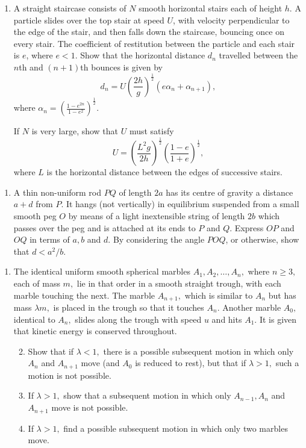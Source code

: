 \documentclass[a4, 11pt]{report}
\newlength{\qspace}
\newcounter{qnumber}
\newenvironment{question}%
 {\vspace{\qspace}
  \begin{enumerate}[\bfseries 1\quad][10]%
    \setcounter{enumi}{\value{qnumber}}%
    \item%
 }
{
  \end{enumerate}
  \filbreak
  \stepcounter{qnumber}
 }
\newenvironment{questionparts}[1][1]%
 {
  \begin{enumerate}[\bfseries (i)]%
    \setcounter{enumii}{#1}
    \addtocounter{enumii}{-1}
    \setlength{\itemsep}{5mm}
    \setlength{\parskip}{8pt}
 }
 {
  \end{enumerate}
 }
\begin{document}
\begin{question}	
A straight staircase consists of $N$ smooth horizontal stairs each
of height $h$. A particle slides over the top stair at speed $U$,
with velocity perpendicular to the edge of the stair, and then falls
down the staircase, bouncing once on every stair. The coefficient
of restitution between the particle and each stair is $e$, where
$e<1$. Show that the horizontal distance $d_{n}$ travelled between
the $n$th and $(n+1)$th bounces is given by 
\[
d_{n}=U\left(\frac{2h}{g}\right)^{\frac{1}{2}}\left(e\alpha_{n}+\alpha_{n+1}\right),
\]
where ${\displaystyle \alpha_{n}=\left(\frac{1-e^{2n}}{1-e^{2}}\right)^{\frac{1}{2}}}$. 


If $N$ is very large, show that $U$ must satisfy
\[
U=\left(\frac{L^{2}g}{2h}\right)^{\frac{1}{2}}\left(\frac{1-e}{1+e}\right)^{\frac{1}{2}},
\]
where $L$ is the horizontal distance between the edges of successive
stairs. 
\end{question}


\begin{question}
A thin non-uniform rod $PQ$ of length $2a$ has its centre of gravity
a distance $a+d$ from $P$. It hangs (not vertically) in equilibrium
suspended from a small smooth peg $O$ by means of a light inextensible
string of length $2b$ which passes over the peg and is attached at
its ends to $P$ and $Q$. Express $OP$ and $OQ$ in terms of $a,b$
and $d$. By considering the angle $POQ$, or otherwise, show that
$d<a^{2}/b$. 

\end{question}
	
\begin{question}
The identical uniform smooth spherical marbles $A_{1},A_{2},\ldots,A_{n},$
where $n\geqslant3,$ each of mass $m,$ lie in that order in a smooth
straight trough, with each marble touching the next. The marble $A_{n+1},$
which is similar to $A_{n}$ but has mass $\lambda m,$ is placed
in the trough so that it touches $A_{n}.$ Another marble $A_{0},$
identical to $A_{n},$ slides along the trough with speed $u$ and
hits $A_{1}.$ It is given that kinetic energy is conserved throughout. 
\begin{questionparts}
\item Show that if $\lambda<1,$ there is a possible subsequent motion in
which only $A_{n}$ and $A_{n+1}$ move (and $A_{0}$ is reduced to
rest), but that if $\lambda>1,$ such a motion is not possible. 
\item If $\lambda>1,$ show that a subsequent motion in which only $A_{n-1},A_{n}$
and $A_{n+1}$ move is not possible. 
\item If $\lambda>1,$ find a possible subsequent motion in which only two
marbles move. 
\end{questionparts}
\end{question}
	
\end{document}
